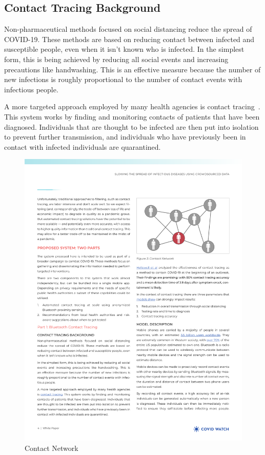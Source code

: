 \documentclass[11pt]{article}
\begin{document}
\subsection{Contact Tracing Background}

Non-pharmaceutical methods focused on social distancing reduce the spread of COVID-19. These methods are based on reducing contact between infected and susceptible people, even when it isn’t known who is infected. 
In the simplest form, this is being achieved by reducing all social events and increasing precautions like handwashing. This is an effective measure because the number of new infections is roughly proportional to the number of contact events with infectious people.


A more targeted approach employed by many health agencies is contact tracing~\cite{contacttracing_ca}. This system works by finding and monitoring contacts of patients that have been diagnosed. Individuals that are thought to be infected are then put into isolation to prevent further transmission, and individuals who have previously been in contact with infected individuals are quarantined.

\begin{figure}[h]
\centering
\includegraphics{figs/fig2.pdf}
\caption{Contact Network}
\end{figure}
\end{document}
